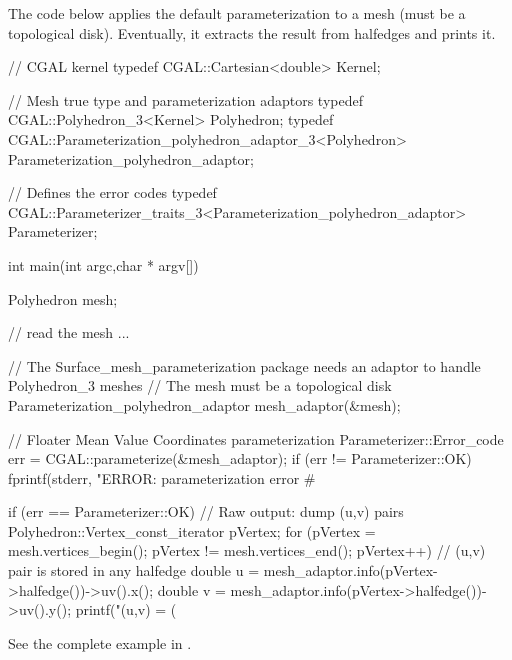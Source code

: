 The code below applies the default parameterization to a
 mesh (must be a topological disk).
Eventually, it extracts the result from halfedges and prints it.

\begin{ccExampleCode}

// CGAL kernel
typedef CGAL::Cartesian<double>                         Kernel;

// Mesh true type and parameterization adaptors
typedef CGAL::Polyhedron_3<Kernel>                      Polyhedron;
typedef CGAL::Parameterization_polyhedron_adaptor_3<Polyhedron>
                                                        Parameterization_polyhedron_adaptor;

// Defines the error codes
typedef CGAL::Parameterizer_traits_3<Parameterization_polyhedron_adaptor>
                                                        Parameterizer;

int main(int argc,char * argv[])
{
    Polyhedron mesh;

    // read the mesh
    ...

    // The Surface_mesh_parameterization package needs an adaptor to handle Polyhedron_3 meshes
    // The mesh must be a topological disk
    Parameterization_polyhedron_adaptor mesh_adaptor(&mesh);

    // Floater Mean Value Coordinates parameterization
    Parameterizer::Error_code err = CGAL::parameterize(&mesh_adaptor);
    if (err != Parameterizer::OK)
        fprintf(stderr, "\nFATAL ERROR: parameterization error # %

    if (err == Parameterizer::OK)
    {
        // Raw output: dump (u,v) pairs
        Polyhedron::Vertex_const_iterator pVertex;
        for (pVertex = mesh.vertices_begin();
            pVertex != mesh.vertices_end();
            pVertex++)
        {
            // (u,v) pair is stored in any halfedge
            double u = mesh_adaptor.info(pVertex->halfedge())->uv().x();
            double v = mesh_adaptor.info(pVertex->halfedge())->uv().y();
            printf("(u,v) = (%
        }
    }
}

\end{ccExampleCode}

See the complete example in .


